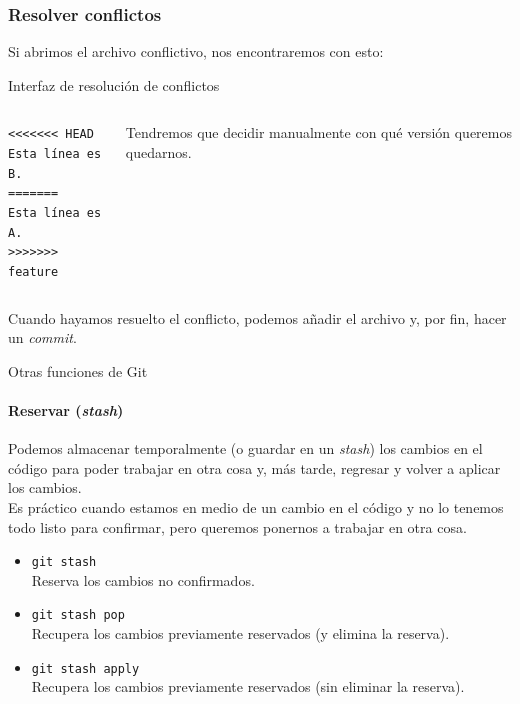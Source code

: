 \documentclass[11pt]{beamer}
\begin{document}
\begin{frame}
    \frametitle{Resolver conflictos}

    Si abrimos el archivo conflictivo, nos encontraremos con esto: \smallskip
    
    \begin{block}{Interfaz de resolución de conflictos}
        \begin{columns}[c]
            \begin{column}{0.35\linewidth}
                \texttt{<<<<<<< HEAD}\\
                \texttt{Esta línea es B.}\\
                \texttt{=======}\\
                \texttt{Esta línea es A.}\\
                \texttt{>>>>>>> feature}\\
            \end{column}

            \begin{column}{0.45\linewidth}
                Tendremos que decidir manualmente con qué versión queremos quedarnos.
            \end{column}
        \end{columns}
    \end{block}

    \bigskip
    
    Cuando hayamos resuelto el conflicto, podemos añadir el archivo y, por fin, hacer un \textit{commit}.
    
\end{frame}


\begin{frame}{Otras funciones de Git}
    \framesubtitle{Reservar (\textit{stash})}

    Podemos almacenar temporalmente (o guardar en un \textit{stash}) los cambios en el código para poder trabajar en otra cosa y, más tarde, regresar y volver a aplicar los cambios.
    \\ \smallskip
    Es práctico cuando estamos en medio de un cambio en el código y no lo tenemos todo listo para confirmar, pero queremos ponernos a trabajar en otra cosa.
    
    \begin{itemize}
        \item \texttt{git stash}\\Reserva los cambios no confirmados.
        \item \texttt{git stash pop}\\Recupera los cambios previamente reservados (y elimina la reserva).
        \item \texttt{git stash apply}\\Recupera los cambios previamente reservados (sin eliminar la reserva).
    \end{itemize}
\end{frame}
\end{document}
